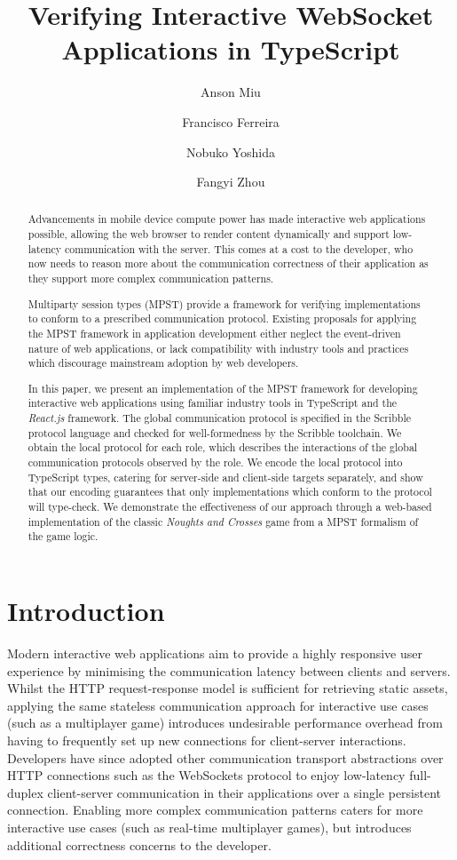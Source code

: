 \documentclass[submission,copyright,creativecommons]{eptcs}
\title{Verifying Interactive WebSocket Applications in TypeScript}
\author{Anson Miu
\institute{Imperial College London}
\and
Francisco Ferreira
\institute{Imperial College London}
\and
Nobuko Yoshida
\institute{Imperial College London}
\and
Fangyi Zhou
\institute{Imperial College London}
}
\begin{document}
\maketitle

\begin{abstract}
Advancements in mobile device compute power has made interactive web applications possible, allowing the web browser to render content dynamically and support low-latency communication with the server. This comes at a cost to the developer, who now needs to reason more about the communication correctness of their application as they support more complex communication patterns. 

Multiparty session types (MPST) provide a framework for verifying implementations to conform to a prescribed communication protocol. Existing proposals for applying the MPST framework in application development either neglect the event-driven nature of web applications, or lack compatibility with industry tools and practices which discourage mainstream adoption by web developers.

In this paper, we present an implementation of the MPST framework for developing interactive web applications using familiar industry tools in TypeScript and the \textit{React.js} framework. The global communication protocol is specified in the Scribble protocol language and checked for well-formedness by the Scribble toolchain. We obtain the local protocol for each role, which describes the interactions of the global communication protocols observed by the role. We encode the local protocol into TypeScript types, catering for server-side and client-side targets separately, and show that our encoding guarantees that only implementations which conform to the protocol will type-check. We demonstrate the effectiveness of our approach through a web-based implementation of the classic \textit{Noughts and Crosses} game from a MPST formalism of the game logic.

\end{abstract}

\section{Introduction}

Modern interactive web applications aim to provide a highly responsive user experience by minimising the communication latency between clients and servers. 
Whilst the HTTP request-response model is sufficient for retrieving static assets, applying the same stateless communication approach for interactive use cases (such as a multiplayer game) introduces undesirable performance overhead from having to frequently set up new connections for client-server interactions. 
Developers have since adopted other communication transport abstractions over HTTP connections such as the WebSockets protocol \cite{WebSocketRFC} to enjoy low-latency full-duplex client-server communication in their applications over a single persistent connection. 
Enabling more complex communication patterns caters for more interactive use cases (such as real-time multiplayer games), but introduces additional correctness concerns to the developer.
\end{document}
